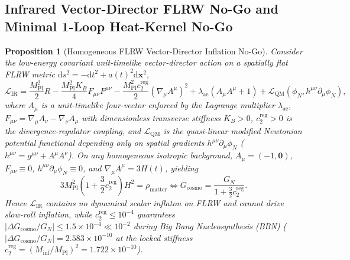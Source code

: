 \documentclass[11pt,a4paper]{article}
\newtheorem{proposition}[theorem]{Proposition}
\begin{document}
\subsection{Infrared Vector-Director FLRW No-Go and Minimal 1-Loop Heat-Kernel No-Go}

\begin{proposition}[Homogeneous FLRW Vector-Director Inflation No-Go]
\label{prop:ir-nogo}
Consider the low-energy covariant unit-timelike vector-director action on a spatially flat FLRW metric $\mathrm{d}s^2 = -\mathrm{d}t^2 + a(t)^2\mathrm{d}\mathbf{x}^2$,
\begin{equation}
\mathcal{L}_{\mathrm{IR}} = \frac{M_{\mathrm{Pl}}^2}{2}R - \frac{M_{\mathrm{Pl}}^2 K_B}{4}F_{\mu\nu}F^{\mu\nu} - \frac{M_{\mathrm{Pl}}^2 c_2^{\mathrm{reg}}}{2}(\nabla_\mu A^\mu)^2 + \lambda_{\mathrm{ae}}(A_\mu A^\mu + 1) + \mathcal{L}_{\mathrm{QM}}(\phi_N, h^{\mu\nu}\partial_\mu\phi_N),
\end{equation}
where $A_\mu$ is a unit-timelike four-vector enforced by the Lagrange multiplier $\lambda_{\mathrm{ae}}$, $F_{\mu\nu} = \nabla_\mu A_\nu - \nabla_\nu A_\mu$ with dimensionless transverse stiffness $K_B > 0$, $c_2^{\mathrm{reg}} > 0$ is the divergence-regulator coupling, and $\mathcal{L}_{\mathrm{QM}}$ is the quasi-linear modified Newtonian potential functional depending only on spatial gradients $h^{\mu\nu}\partial_\mu\phi_N$ ($h^{\mu\nu} = g^{\mu\nu} + A^\mu A^\nu$). On any homogeneous isotropic background, $A_\mu = (-1, \mathbf{0})$, $F_{\mu\nu} \equiv 0$, $h^{\mu\nu}\partial_\mu\phi_N \equiv 0$, and $\nabla_\mu A^\mu = 3H(t)$, yielding
\begin{equation}
3 M_{\mathrm{Pl}}^2\left(1 + \frac{3}{2}c_2^{\mathrm{reg}}\right) H^2 = \rho_{\mathrm{matter}} \iff G_{\mathrm{cosmo}} = \frac{G_N}{1 + \frac{3}{2}c_2^{\mathrm{reg}}}.
\label{eq:g-cosmo}
\end{equation}
Hence $\mathcal{L}_{\mathrm{IR}}$ contains no dynamical scalar inflaton on FLRW and cannot drive slow-roll inflation, while $c_2^{\mathrm{reg}} \le 10^{-4}$ guarantees $|\Delta G_{\mathrm{cosmo}}/G_N| \le 1.5\times 10^{-4} \ll 10^{-2}$ during Big Bang Nucleosynthesis (BBN) ($|\Delta G_{\mathrm{cosmo}}/G_N| = 2.583\times 10^{-10}$ at the locked stiffness $c_2^{\mathrm{reg}} = (M_{\mathrm{inf}}/M_{\mathrm{Pl}})^2 = 1.722\times 10^{-10}$).
\end{proposition}
\end{document}
